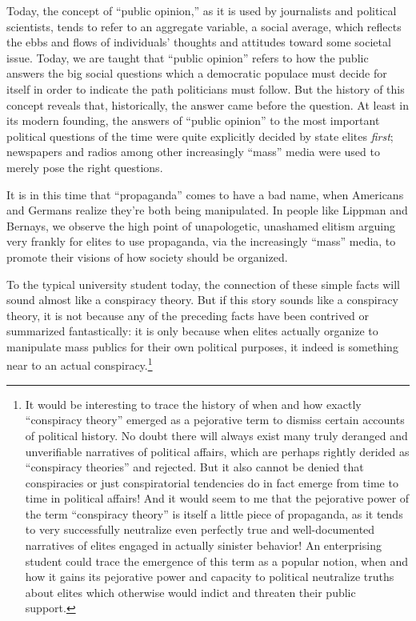 \documentclass[12pt,book]{article}
\begin{document}
Today, the concept of ``public opinion,'' as it is used by journalists
and political scientists, tends to refer to an aggregate variable, a
social average, which reflects the ebbs and flows of individuals'
thoughts and attitudes toward some societal issue. Today, we are taught
that ``public opinion'' refers to how the public answers the big social
questions which a democratic populace must decide for itself in order to
indicate the path politicians must follow. But the history of this
concept reveals that, historically, the answer came before the question.
At least in its modern founding, the answers of ``public opinion'' to
the most important political questions of the time were quite explicitly
decided by state elites \emph{first}; newspapers and radios among other
increasingly ``mass'' media were used to merely pose the right
questions.

It is in this time that ``propaganda'' comes to have a bad name, when
Americans and Germans realize they're both being manipulated. In people
like Lippman and Bernays, we observe the high point of unapologetic,
unashamed elitism arguing very frankly for elites to use propaganda, via
the increasingly ``mass'' media, to promote their visions of how society
should be organized.

To the typical university student today, the connection of these simple
facts will sound almost like a conspiracy theory. But if this story
sounds like a conspiracy theory, it is not because any of the preceding
facts have been contrived or summarized fantastically: it is only
because when elites actually organize to manipulate mass publics for
their own political purposes, it indeed is something near to an actual
conspiracy.\footnote{It would be interesting to trace the history of
  when and how exactly ``conspiracy theory'' emerged as a pejorative
  term to dismiss certain accounts of political history. No doubt there
  will always exist many truly deranged and unverifiable narratives of
  political affairs, which are perhaps rightly derided as ``conspiracy
  theories'' and rejected. But it also cannot be denied that
  conspiracies or just conspiratorial tendencies do in fact emerge from
  time to time in political affairs! And it would seem to me that the
  pejorative power of the term ``conspiracy theory'' is itself a little
  piece of propaganda, as it tends to very successfully neutralize even
  perfectly true and well-documented narratives of elites engaged in
  actually sinister behavior! An enterprising student could trace the
  emergence of this term as a popular notion, when and how it gains its
  pejorative power and capacity to political neutralize truths about
  elites which otherwise would indict and threaten their public support.}
\end{document}
